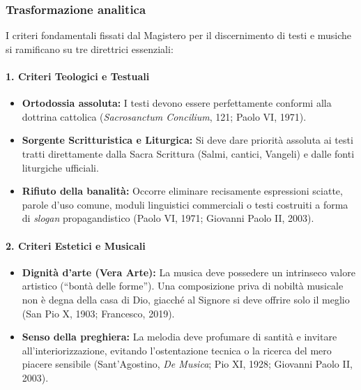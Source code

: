 \documentclass[12pt,a4paper]{article}
\begin{document}
	\subsubsection{Trasformazione analitica}\label{trasformazione-analitica-5}
	
	I criteri fondamentali fissati dal Magistero per il discernimento di testi e musiche si ramificano su tre direttrici essenziali:
	
	\paragraph{1. Criteri Teologici e Testuali}\label{criteri-teologici-e-testuali}
	
	\begin{itemize}[leftmargin=*]
		\item \textbf{Ortodossia assoluta:} I testi devono essere perfettamente conformi alla dottrina cattolica (\emph{Sacrosanctum Concilium}, 121; Paolo VI, 1971).
		\item \textbf{Sorgente Scritturistica e Liturgica:} Si deve dare priorità assoluta ai testi tratti direttamente dalla Sacra Scrittura (Salmi, cantici, Vangeli) e dalle fonti liturgiche ufficiali.
		\item \textbf{Rifiuto della banalità:} Occorre eliminare recisamente espressioni sciatte, parole d'uso comune, moduli linguistici commerciali o testi costruiti a forma di \emph{slogan} propagandistico (Paolo VI, 1971; Giovanni Paolo II, 2003).
	\end{itemize}
	
	\paragraph{2. Criteri Estetici e Musicali}\label{criteri-estetici-e-musicali}
	
	\begin{itemize}[leftmargin=*]
		\item \textbf{Dignità d'arte (Vera Arte):} La musica deve possedere un intrinseco valore artistico (``bontà delle forme''). Una composizione priva di nobiltà musicale non è degna della casa di Dio, giacché al Signore si deve offrire solo il meglio (San Pio X, 1903; Francesco, 2019).
		\item \textbf{Senso della preghiera:} La melodia deve profumare di santità e invitare all'interiorizzazione, evitando l'ostentazione tecnica o la ricerca del mero piacere sensibile (Sant'Agostino, \emph{De Musica}; Pio XI, 1928; Giovanni Paolo II, 2003).
	\end{itemize}
	
\end{document}
